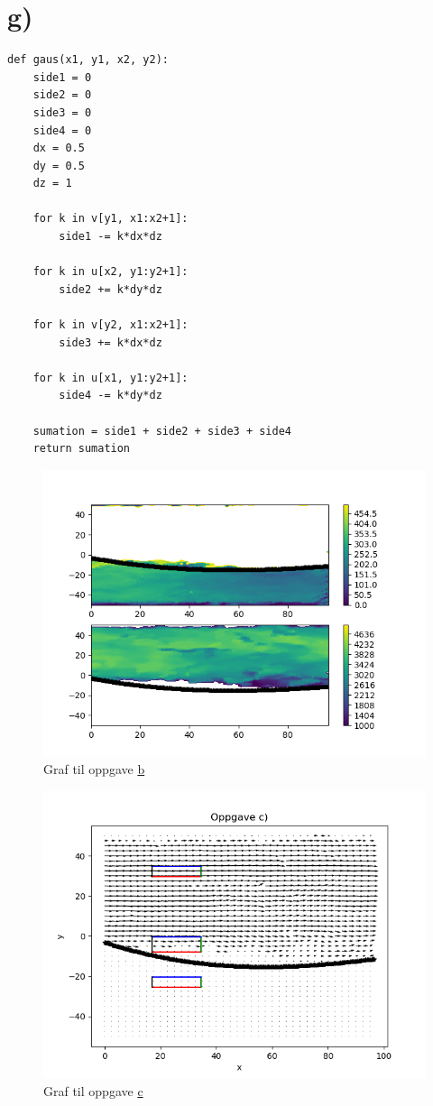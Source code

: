 \documentclass[a4paper,10pt,norsk]{article}
\begin{document}
	\section*{g)}\label{ass:g}
\begin{lstlisting}
def gaus(x1, y1, x2, y2):
    side1 = 0
    side2 = 0
    side3 = 0
    side4 = 0
    dx = 0.5
    dy = 0.5
    dz = 1

    for k in v[y1, x1:x2+1]:
        side1 -= k*dx*dz

    for k in u[x2, y1:y2+1]:
        side2 += k*dy*dz

    for k in v[y2, x1:x2+1]:
        side3 += k*dx*dz

    for k in u[x1, y1:y2+1]:
        side4 -= k*dy*dz

    sumation = side1 + side2 + side3 + side4
    return sumation

\end{lstlisting}
	\newpage
	\begin{figure}[h!]
		\centering
		\caption{Graf til oppgave \hyperref[ass:b]{b}}
		\label{fig:b}
		\includegraphics{oppgave_b.png}
	\end{figure}
	\begin{figure}[h!]
		\centering
		\caption{Graf til oppgave \hyperref[ass:c]{c}} 
		\label{fig:c}
		\includegraphics{oppgave_c.png}
	\end{figure}
\end{document}
